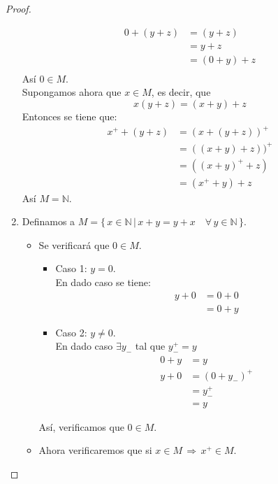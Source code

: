 \begin{proof}
\begin{enumerate}
                \begin{align*}
                    0 + (y + z) &= (y+z) \\
                               &= y+z \\
                               &= (0 + y ) + z \\
                \end{align*}
                Así $ 0 \in M$. \\
                Supongamos ahora que $x \in M$, es decir, que 
                \[
                    x (y+z) = (x+y)+z
                \]
                Entonces se tiene que:
                \begin{align*}
                    x^+ + (y +z) & = (x + (y + z))^+ \\
                                 & = ((x + y)+ z))^+ \\
                                 & = ((x+ y)^+ +z) \\
                                 & = (x^+ + y ) + z
                \end{align*}
                Así $M = \mathbb{N}$.
            \item Definamos a $M = \{\, x \in \mathbb{N} \, | \, x + y = y + x
                \quad \forall \, y \in \mathbb{N} \, \}$.
                \begin{itemize}
                    \item Se verificará que $0 \in M$.
                 \begin{itemize}
                    \item Caso 1: $y=0$. \\
                        En dado caso se tiene:
                        \begin{align*}
                            y+0 &= 0 + 0 \\
                                &= 0 + y
                         \end{align*}
                    \item Caso 2: $y \neq 0$. \\
                        En dado caso $\exists y_-$ tal que $y_-^+ = y$
                         \begin{align*}
                            0+y &= y \\
                            y+0 &= (0 + y_-)^+ \\
                                &= y_-^+ \\
                                &= y
                        \end{align*}
                \end{itemize} 
                Así, verificamos que $0 \in M$.
            \item Ahora verificaremos que si $x \in M \, \Rightarrow \,x^+ \in
                M$. \\


\end{itemize}
\end{enumerate}
\end{proof}
